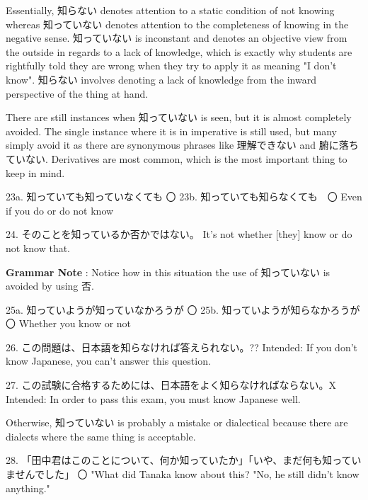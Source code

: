 \par{ Essentially, 知らない denotes attention to a static condition of not knowing whereas 知っていない denotes attention to the completeness of knowing in the negative sense. 知っていない is inconstant and denotes an objective view from the outside in regards to a lack of knowledge, which is exactly why students are rightfully told they are wrong when they try to apply it as meaning "I don't know". 知らない involves denoting a lack of knowledge from the inward perspective of the thing at hand. }

\par{ There are still instances when 知っていない is seen, but it is almost completely avoided. The single instance where it is in imperative is still used, but many simply avoid it as there are synonymous phrases like 理解できない and 腑に落ちていない. Derivatives are most common, which is the most important thing to keep in mind. }

\par{23a. 知っていても知っていなくても 〇 \hfill\break
23b. 知っていても知らなくても　〇 \hfill\break
Even if you do or do not know }

\par{24. そのことを知っているか否かではない。 \hfill\break
It's not whether [they] know or do not know that. }

\par{\textbf{Grammar Note }: Notice how in this situation the use of 知っていない is avoided by using 否. }

\par{25a. 知っていようが知っていなかろうが 〇 \hfill\break
25b. 知っていようが知らなかろうが 〇 \hfill\break
Whether you know or not }

\par{26. この問題は、日本語を知らなければ答えられない。?? \hfill\break
Intended: If you don't know Japanese, you can't answer this question. }

\par{27. この試験に合格するためには、日本語をよく知らなければならない。X \hfill\break
Intended: In order to pass this exam, you must know Japanese well. }

\par{ Otherwise, 知っていない is probably a mistake or dialectical because there are dialects where the same thing is acceptable. }

\par{28. 「田中君はこのことについて、何か知っていたか」「いや、まだ何も知っていませんでした」 〇 \hfill\break
"What did Tanaka know about this? "No, he still didn't know anything." }
    